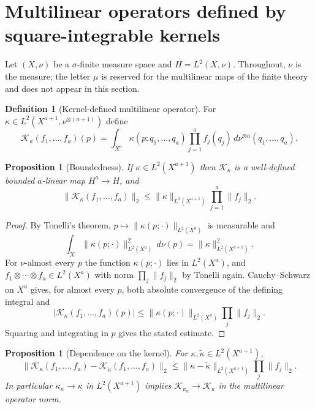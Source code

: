 \documentclass[11pt]{amsart}
\newtheorem{proposition}[theorem]{Proposition}
\theoremstyle{definition}
\newtheorem{definition}[theorem]{Definition}
\theoremstyle{remark}
\newcommand{\norm}[1]{\lVert#1\rVert}
\newcommand{\Kop}{\mathcal K}
\begin{document}
\section{Multilinear operators defined by square-integrable kernels}
\label{sec:kernel}

Let $(X,\nu)$ be a $\sigma$-finite measure space and $H=L^2(X,\nu)$. Throughout, $\nu$ is
the measure; the letter $\mu$ is reserved for the multilinear maps of the finite theory
and does not appear in this section.

\begin{definition}[Kernel-defined multilinear operator]
\label{def:kernelop}
For $\kappa\in L^{2}(X^{a+1},\nu^{\otimes(a+1)})$ define
\[
 \Kop_\kappa(f_1,\ldots,f_a)(p)
 =\int_{X^{a}}\kappa(p;q_1,\ldots,q_a)\prod_{j=1}^{a}f_j(q_j)\,
 d\nu^{\otimes a}(q_1,\ldots,q_a).
\]
\end{definition}

\begin{proposition}[Boundedness]
\label{prop:bounded}
If $\kappa\in L^{2}(X^{a+1})$ then $\Kop_\kappa$ is a well-defined bounded $a$-linear map
$H^{a}\to H$, and
\[
 \norm{\Kop_\kappa(f_1,\ldots,f_a)}_{2}
 \le\norm{\kappa}_{L^{2}(X^{a+1})}\prod_{j=1}^{a}\norm{f_j}_{2}.
\]
\end{proposition}

\begin{proof}
By Tonelli's theorem, $p\mapsto\norm{\kappa(p;\cdot)}_{L^{2}(X^{a})}$ is measurable and
\[
 \int_X\norm{\kappa(p;\cdot)}_{L^{2}(X^{a})}^{2}\,d\nu(p)=\norm{\kappa}_{L^{2}(X^{a+1})}^{2}.
\]
For $\nu$-almost every $p$ the function $\kappa(p;\cdot)$ lies in $L^{2}(X^{a})$, and
$f_1\otimes\cdots\otimes f_a\in L^{2}(X^{a})$ with norm $\prod_j\norm{f_j}_2$ by Tonelli
again. Cauchy--Schwarz on $X^{a}$ gives, for almost every $p$, both absolute convergence
of the defining integral and
\[
 \bigl\lvert\Kop_\kappa(f_1,\ldots,f_a)(p)\bigr\rvert
 \le\norm{\kappa(p;\cdot)}_{L^{2}(X^{a})}\prod_{j}\norm{f_j}_{2}.
\]
Squaring and integrating in $p$ gives the stated estimate.
\end{proof}

\begin{proposition}[Dependence on the kernel]
\label{prop:stability}
For $\kappa,\widetilde\kappa\in L^{2}(X^{a+1})$,
\[
 \norm{\Kop_\kappa(f_1,\ldots,f_a)-\Kop_{\widetilde\kappa}(f_1,\ldots,f_a)}_{2}
 \le\norm{\kappa-\widetilde\kappa}_{L^{2}(X^{a+1})}\prod_j\norm{f_j}_2 .
\]
In particular $\kappa_n\to\kappa$ in $L^{2}(X^{a+1})$ implies
$\Kop_{\kappa_n}\to\Kop_\kappa$ in the multilinear operator norm.
\end{proposition}
\end{document}
